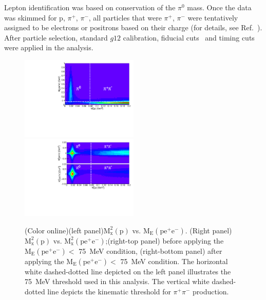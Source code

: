 \documentclass[aps,prc,twocolumn,floatfix,showpacs,preprintnumbers,amsmath,amssymb,superscriptaddress,linenumbers]{revtex4-1}
\begin{document}
Lepton identification was based on conservation of the 
$\pi^0$ mass. Once the data was skimmed for p, $\pi^+$, $\pi^-$, 
all particles that were $\pi^+$, $\pi^-$ were tentatively assigned 
to be electrons or positrons based on their charge (for details, 
see Ref.~\cite{Kunkel}).  After particle selection, standard $g12$ 
calibration, fiducial cuts~\cite{g12} and timing cuts were applied 
in the analysis.
\begin{figure}[htb!]
        \centerline{
               \includegraphics[height=0.35\textwidth,width=0.5\textwidth]{ME_vs_mxpcompare.pdf}\hfill
               \includegraphics[height=0.35\textwidth,width=0.5\textwidth]{mm2_vs_mxp_compare.pdf}}

        \caption{(Color online)(left panel)$\mathrm{M_x^2(p)}$ vs.
        $\mathrm{M_E(pe^+e^-)}$. (Right panel)$\mathrm{M_x^2(p)}$ vs.
        $\mathrm{M_x^2(pe^+e^-)}$;(right-top panel) before applying the
        $\mathrm{M_E(pe^+e^-)} <$ 75~MeV condition, (right-bottom panel)
        after applying the $\mathrm{M_E(pe^+e^-)} <$ 75~MeV condition.
        The horizontal white dashed-dotted line depicted on the left
        panel illustrates the 75~MeV threshold used in this analysis.
        The vertical white dashed-dotted line depicts the kinematic
        threshold for $\pi^+\pi^-$ production.
        }\label{fig:sys}
\end{figure}
\end{document}
